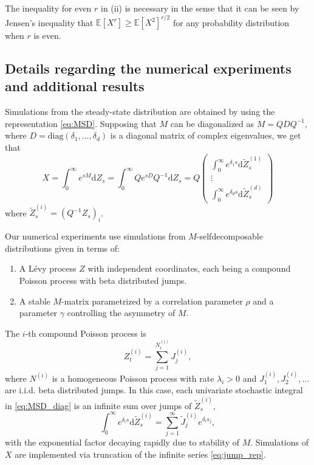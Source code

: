 \documentclass{biometrika}
\begin{document}
\begin{remark}
The inequality for even $r$ in (ii) is necessary in the sense that it can be seen by Jensen's inequality that $\mathbb{E}[X^{r}] \geq \mathbb{E}[X^2]^{r/2}$ for any probability distribution when $r$ is even. 
\end{remark}

\subsection{Details regarding the numerical experiments and additional results}
\label{sec:numerical_details} 
Simulations from the steady-state distribution are obtained by using the representation 
\eqref{eq:MSD}. Supposing that $M$ can be diagonalized as $M = Q D Q^{-1}$, where
$D = \mathrm{diag}(\delta_1, \ldots, \delta_d)$ is a diagonal matrix of
complex eigenvalues, we get that
\begin{equation}
    \label{eq:MSD_diag}
	X = \int_0^{\infty}  e^{sM} \mathrm{d} Z_s                
	  = \int_0^{\infty}  Q e^{sD} Q^{-1} \mathrm{d} Z_s 
	  = Q \begin{pmatrix}
	      \int_0^{\infty} e^{\delta_1 s} \mathrm{d} \tilde{Z}_{s}^{(1)} \\
			\vdots                                                          \\
			\int_0^{\infty} e^{\delta_d s} \mathrm{d} \tilde{Z}_{s}^{(d)}
	  \end{pmatrix}
\end{equation}
where $\tilde{Z}_{s}^{(i)} = (Q^{-1} Z_s)_i$. 

Our numerical experiments use simulations from $M$-selfdecomposable distributions given in terms of:
\begin{enumerate}
	\item A Lévy process $Z$ with independent coordinates, each being a compound Poisson process with beta distributed jumps.
	\item A stable $M$-matrix parametrized by a correlation parameter $\rho$ and a parameter $\gamma$ controlling the asymmetry of $M$.
\end{enumerate}
The $i$-th compound Poisson process is
$$
	Z^{(i)}_t = \sum_{j=1}^{N^{(i)}_t} J_j^{(i)},
$$
where $N^{(i)}$ is a homogeneous Poisson process with rate $\lambda_i > 0$ and
$J_1^{(i)}, J_2^{(i)}, \ldots $ are i.i.d. beta distributed jumps. In this case, 
each univariate stochastic integral in \eqref{eq:MSD_diag} is an infinite sum over jumps of $\tilde{Z}_{s}^{(i)}$, 
\begin{equation}
\label{eq:jump_rep}
\int_0^{\infty} e^{\delta_i s} \mathrm{d} \tilde{Z}_{s}^{(i)} = \sum_{j=1}^{\infty}  
\tilde{J}_{j}^{(i)} e^{\delta_i s_j}, 
\end{equation}
with the exponential factor decaying rapidly due to stability of $M$. Simulations of $X$ 
are implemented via truncation of the infinite series \eqref{eq:jump_rep}.
\end{document}
